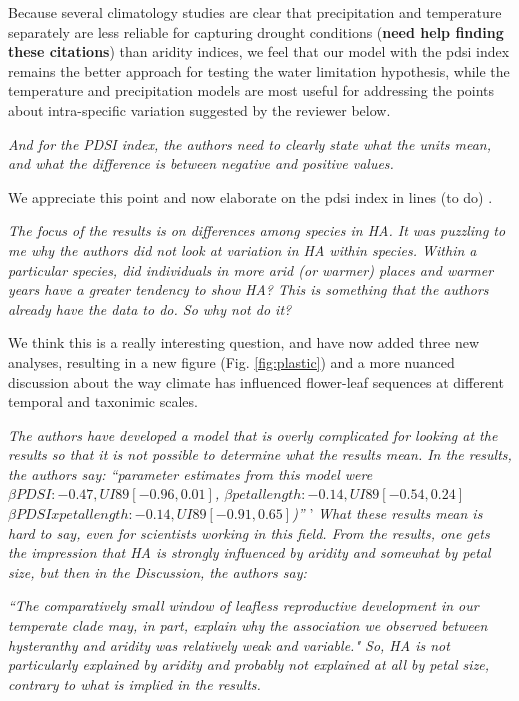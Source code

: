 \documentclass{article}[12pt]
\begin{document}
Because several climatology studies are clear that precipitation and temperature separately are less reliable for capturing drought conditions (\textbf{need help finding these citations}) than aridity indices, we feel that our model with the pdsi index remains the better approach for testing the water limitation hypothesis, while the temperature and precipitation models are most useful for addressing the points about intra-specific variation suggested by the reviewer below. 


\emph{And for the PDSI index, the authors need to clearly state what the units mean, and what the difference is between negative and positive values.} 

We appreciate this point and now elaborate on the pdsi index in lines (to do) .

\emph{The focus of the results is on differences among species in HA.  It was puzzling to me why the authors did not look at variation in HA within species. Within a particular species, did individuals in more arid (or warmer) places and warmer years have a greater tendency to show HA? This is something that the authors already have the data to do. So why not do it?}

We think this is a really interesting question, and have now added three new analyses, resulting in a new figure (Fig. \ref{fig:plastic}) and a more nuanced discussion about the way climate has influenced flower-leaf sequences at different temporal and taxonimic scales.

\emph{The authors have developed a model that is overly complicated for looking at the results so that it is not possible to determine what the results mean. In the results, the authors say: 
``parameter estimates from this model were $\beta PDSI : −0.47,UI89[−0.96,0.01]$, $\beta petal length : −0.14,UI89[−0.54,0.24]$ $\beta PDSIxpetal length : −0.14,UI89[−0.91,0.65]$)''}
'
\emph{What these results mean is hard to say, even for scientists working in this field.  From the results, one gets the impression that HA is strongly influenced by aridity and somewhat by petal size, but then in the Discussion, the authors say:}

\emph{``The comparatively small window of leafless reproductive development in our temperate clade may, in part, explain why the association we observed between hysteranthy and aridity was relatively weak and variable." So, HA is not particularly explained by aridity and probably not explained at all by petal size, contrary to what is implied in the results.}
\end{document}

